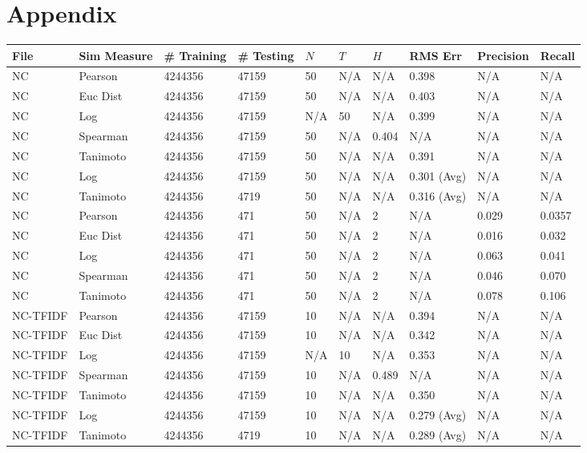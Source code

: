 \documentclass{article}
\begin{document}
\section*{Appendix}

\begin{longtable}{ |p{1.7cm}|p{1.9cm}|p{1.5cm}|p{1.5cm}|p{0.75cm}|p{0.75cm}|p{0.75cm}|p{0.75cm}|p{1.5cm}|p{1.5cm}|}
    \hline
    File & Sim Measure & \# Training & \# Testing & $N$ & $T$ & $H$ & RMS Err & Precision & Recall \\ \hline\hline
    NC & Pearson & 4244356 & 47159 & 50 & N/A & N/A & 0.398 & N/A & N/A  \\ \hline
    NC  & Euc Dist & 4244356 & 47159 & 50 & N/A & N/A & 0.403 & N/A & N/A   \\ \hline
    NC  & Log & 4244356 & 47159  & N/A &  50 & N/A& 0.399 & N/A & N/A  \\ \hline
    NC  & Spearman & 4244356 & 47159  & 50 & N/A & 0.404 & N/A & N/A & N/A \\ \hline
    NC  & Tanimoto & 4244356 & 47159 & 50 & N/A& N/A & 0.391 & N/A & N/A \\ \hline
    NC  & Log & 4244356 & 47159 & 50 & N/A& N/A & 0.301 (Avg) & N/A & N/A \\ \hline
    NC  & Tanimoto & 4244356 & 4719 & 50 & N/A & N/A & 0.316 (Avg) & N/A & N/A \\ \hline
    
    NC  & Pearson & 4244356 & 471 & 50 & N/A  & 2 & N/A & 0.029 & 0.0357  \\ \hline
    NC  & Euc Dist & 4244356 & 471 & 50 & N/A  & 2 & N/A & 0.016 & 0.032   \\ \hline
    NC  & Log & 4244356 & 471& 50 & N/A & 2 & N/A & 0.063 & 0.041  \\ \hline
    NC  & Spearman & 4244356 & 471 & 50 & N/A  & 2 & N/A &0.046 & 0.070 \\ \hline
    NC  & Tanimoto & 4244356 & 471 & 50 & N/A  & 2 & N/A & 0.078 & 0.106 \\ \hline
    
    NC-TFIDF & Pearson & 4244356 & 47159 & 10 & N/A & N/A & 0.394 & N/A & N/A  \\ \hline
    NC-TFIDF  & Euc Dist & 4244356 & 47159 & 10 & N/A & N/A & 0.342 & N/A & N/A   \\ \hline
    NC-TFIDF  & Log & 4244356 & 47159  & N/A &  10 & N/A& 0.353 & N/A & N/A  \\ \hline
    NC-TFIDF  & Spearman & 4244356 & 47159  & 10 & N/A & 0.489 & N/A & N/A & N/A \\ \hline
    NC-TFIDF  & Tanimoto & 4244356 & 47159 & 10 & N/A& N/A & 0.350 & N/A & N/A \\ \hline
    NC-TFIDF  & Log & 4244356 & 47159 & 10 & N/A& N/A & 0.279 (Avg) & N/A & N/A \\ \hline
    NC-TFIDF  & Tanimoto & 4244356 & 4719 & 10 & N/A & N/A & 0.289 (Avg) & N/A & N/A \\ \hline
    

\end{longtable}
\end{document}

